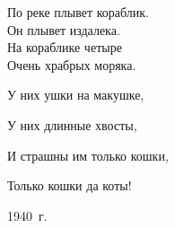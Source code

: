 \begin{flushleft}
	По реке плывет кораблик.\\
	Он плывет издалека.\\
	На кораблике четыре\\
	Очень храбрых моряка.
\end{flushleft}

\begin{center}
	\hspace*{2cm}
	\begin{minipage}{0.45\textwidth}
		У них ушки на макушке,

		У них длинные хвосты,
		
		И страшны им только кошки,
		
		Только кошки да коты!
	\end{minipage}
\end{center}

\begin{flushright}
	1940~г.
\end{flushright}